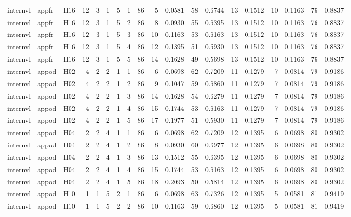 \begin{longtable}{lllrrrrrrrrrrrrrrrr}
internvl & appfr & H16 & 12 & 3 & 1 & 5 & 1 & 86 & 5 & 0.0581 & 58 & 0.6744 & 13 & 0.1512 & 10 & 0.1163 & 76 & 0.8837 \\
internvl & appfr & H16 & 12 & 3 & 1 & 5 & 2 & 86 & 8 & 0.0930 & 55 & 0.6395 & 13 & 0.1512 & 10 & 0.1163 & 76 & 0.8837 \\
internvl & appfr & H16 & 12 & 3 & 1 & 5 & 3 & 86 & 10 & 0.1163 & 53 & 0.6163 & 13 & 0.1512 & 10 & 0.1163 & 76 & 0.8837 \\
internvl & appfr & H16 & 12 & 3 & 1 & 5 & 4 & 86 & 12 & 0.1395 & 51 & 0.5930 & 13 & 0.1512 & 10 & 0.1163 & 76 & 0.8837 \\
internvl & appfr & H16 & 12 & 3 & 1 & 5 & 5 & 86 & 14 & 0.1628 & 49 & 0.5698 & 13 & 0.1512 & 10 & 0.1163 & 76 & 0.8837 \\
internvl & appod & H02 & 4 & 2 & 2 & 1 & 1 & 86 & 6 & 0.0698 & 62 & 0.7209 & 11 & 0.1279 & 7 & 0.0814 & 79 & 0.9186 \\
internvl & appod & H02 & 4 & 2 & 2 & 1 & 2 & 86 & 9 & 0.1047 & 59 & 0.6860 & 11 & 0.1279 & 7 & 0.0814 & 79 & 0.9186 \\
internvl & appod & H02 & 4 & 2 & 2 & 1 & 3 & 86 & 14 & 0.1628 & 54 & 0.6279 & 11 & 0.1279 & 7 & 0.0814 & 79 & 0.9186 \\
internvl & appod & H02 & 4 & 2 & 2 & 1 & 4 & 86 & 15 & 0.1744 & 53 & 0.6163 & 11 & 0.1279 & 7 & 0.0814 & 79 & 0.9186 \\
internvl & appod & H02 & 4 & 2 & 2 & 1 & 5 & 86 & 17 & 0.1977 & 51 & 0.5930 & 11 & 0.1279 & 7 & 0.0814 & 79 & 0.9186 \\
internvl & appod & H04 & 2 & 2 & 4 & 1 & 1 & 86 & 6 & 0.0698 & 62 & 0.7209 & 12 & 0.1395 & 6 & 0.0698 & 80 & 0.9302 \\
internvl & appod & H04 & 2 & 2 & 4 & 1 & 2 & 86 & 8 & 0.0930 & 60 & 0.6977 & 12 & 0.1395 & 6 & 0.0698 & 80 & 0.9302 \\
internvl & appod & H04 & 2 & 2 & 4 & 1 & 3 & 86 & 13 & 0.1512 & 55 & 0.6395 & 12 & 0.1395 & 6 & 0.0698 & 80 & 0.9302 \\
internvl & appod & H04 & 2 & 2 & 4 & 1 & 4 & 86 & 15 & 0.1744 & 53 & 0.6163 & 12 & 0.1395 & 6 & 0.0698 & 80 & 0.9302 \\
internvl & appod & H04 & 2 & 2 & 4 & 1 & 5 & 86 & 18 & 0.2093 & 50 & 0.5814 & 12 & 0.1395 & 6 & 0.0698 & 80 & 0.9302 \\
internvl & appod & H10 & 1 & 1 & 5 & 2 & 1 & 86 & 6 & 0.0698 & 63 & 0.7326 & 12 & 0.1395 & 5 & 0.0581 & 81 & 0.9419 \\
internvl & appod & H10 & 1 & 1 & 5 & 2 & 2 & 86 & 10 & 0.1163 & 59 & 0.6860 & 12 & 0.1395 & 5 & 0.0581 & 81 & 0.9419 \\

\end{longtable}
